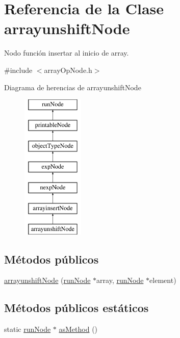 \hypertarget{classarrayunshiftNode}{\section{Referencia de la Clase arrayunshift\-Node}
\label{classarrayunshiftNode}
}


Nodo función insertar al inicio de array.  




{\ttfamily \#include $<$array\-Op\-Node.\-h$>$}

Diagrama de herencias de arrayunshift\-Node\begin{figure}[H]
\begin{center}
\leavevmode
\includegraphics[height=7.000000cm]{classarrayunshiftNode}
\end{center}
\end{figure}
\subsection*{Métodos públicos}
\begin{DoxyCompactItemize}
\item 
\hyperlink{classarrayunshiftNode_af5da6d19f37b71f2daf3cac637c4b569}{arrayunshift\-Node} (\hyperlink{classrunNode}{run\-Node} $\ast$array, \hyperlink{classrunNode}{run\-Node} $\ast$element)
\end{DoxyCompactItemize}
\subsection*{Métodos públicos estáticos}
\begin{DoxyCompactItemize}
\item 
static \hyperlink{classrunNode}{run\-Node} $\ast$ \hyperlink{classarrayunshiftNode_a1f422544b724e343d01fd84d227daad0}{as\-Method} ()
\end{DoxyCompactItemize}


